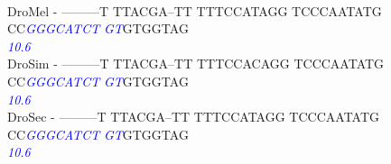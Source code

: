 \documentclass[11pt,twoside,reqno,a4paper]{article}
\begin{document}
{\\
DroMel	-	---------T	TTACGA--TT	TTTCCATAGG	TCCCAATATG	CC\textit{\textcolor{Blue}{G}}\textit{\textcolor{Blue}{G}}\textit{\textcolor{Blue}{G}}\textit{\textcolor{Blue}{C}}\textit{\textcolor{Blue}{A}}\textit{\textcolor{Blue}{T}}\textit{\textcolor{Blue}{C}}\textit{\textcolor{Blue}{T}}	\textit{\textcolor{Blue}{G}}\textit{\textcolor{Blue}{T}}GTGGTAG\\
\hspace*{7\charwidth}\hspace*{1\charwidth}\hspace*{1\charwidth}\hspace*{1\charwidth}\hspace*{1\charwidth}\hspace*{1\charwidth}\hspace*{43\charwidth}\textit{\textcolor{Blue}{10.6}}\hspace*{1\charwidth}\\
DroSim	-	---------T	TTACGA--TT	TTTCCACAGG	TCCCAATATG	CC\textit{\textcolor{Blue}{G}}\textit{\textcolor{Blue}{G}}\textit{\textcolor{Blue}{G}}\textit{\textcolor{Blue}{C}}\textit{\textcolor{Blue}{A}}\textit{\textcolor{Blue}{T}}\textit{\textcolor{Blue}{C}}\textit{\textcolor{Blue}{T}}	\textit{\textcolor{Blue}{G}}\textit{\textcolor{Blue}{T}}GTGGTAG\\
\hspace*{7\charwidth}\hspace*{1\charwidth}\hspace*{1\charwidth}\hspace*{1\charwidth}\hspace*{1\charwidth}\hspace*{1\charwidth}\hspace*{43\charwidth}\textit{\textcolor{Blue}{10.6}}\hspace*{1\charwidth}\\
DroSec	-	---------T	TTACGA--TT	TTTCCATAGG	TCCCAATATG	CC\textit{\textcolor{Blue}{G}}\textit{\textcolor{Blue}{G}}\textit{\textcolor{Blue}{G}}\textit{\textcolor{Blue}{C}}\textit{\textcolor{Blue}{A}}\textit{\textcolor{Blue}{T}}\textit{\textcolor{Blue}{C}}\textit{\textcolor{Blue}{T}}	\textit{\textcolor{Blue}{G}}\textit{\textcolor{Blue}{T}}GTGGTAG\\
\hspace*{7\charwidth}\hspace*{1\charwidth}\hspace*{1\charwidth}\hspace*{1\charwidth}\hspace*{1\charwidth}\hspace*{1\charwidth}\hspace*{43\charwidth}\textit{\textcolor{Blue}{10.6}}\hspace*{1\charwidth}\\
}
\end{document}
